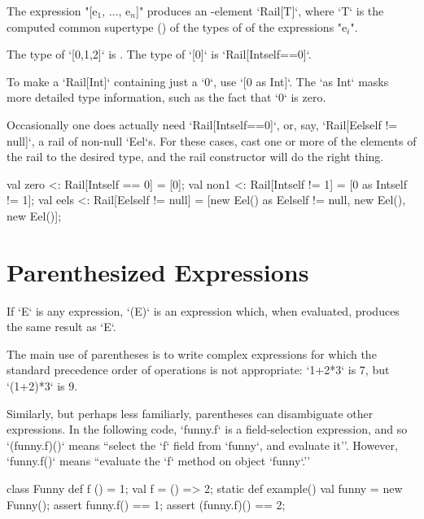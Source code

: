 The expression \xcdmath"[e$_1$, $\ldots$, e$_n$]" produces an -element
\xcd`Rail[T]`, where \xcd`T` is the computed common supertype ()
of the types of of the expressions  \xcdmath"e$_i$". 

\begin{ex}
The type of
\xcd`[0,1,2]` is .    
The type of 
\xcd`[0]` is  \xcd`Rail[Int{self==0}]`. 

To make a \xcd`Rail[Int]` containing just a \xcd`0`, use
\xcd`[0 as Int]`.  The \xcd`as Int` masks more detailed type information, such
as the fact that \xcd`0` is zero.

\end{ex}



\begin{ex}
Occasionally one does actually need \xcd`Rail[Int{self==0}]`, 
or, say, \xcd`Rail[Eel{self != null}]`, a rail of non-null \xcd`Eel`s.  
For these cases, cast one or more of the elements of the rail to 
the desired type, and the rail constructor will do the right thing.  
\begin{xten}
val zero <: Rail[Int{self == 0}]
          = [0];
val non1 <: Rail[Int{self != 1}]
          = [0 as Int{self != 1}];
val eels <: Rail[Eel{self != null}] 
          = [new Eel() as Eel{self != null}, 
             new Eel(), new Eel()];
\end{xten}
\end{ex}


\section{Parenthesized Expressions}

If \xcd`E` is any expression, \xcd`(E)` is an expression which, when
evaluated, produces the same result as \xcd`E`.   

\begin{ex}
The main use of parentheses is to write complex expressions for which the 
standard precedence order of operations is not appropriate: \xcd`1+2*3` is 7,
but \xcd`(1+2)*3` is 9.  

Similarly, but perhaps less familiarly, 
parentheses can disambiguate other expressions.  In the following code, 
\xcd`funny.f` is a field-selection expression, and so \xcd`(funny.f)()` means
``select the \xcd`f` field from \xcd`funny`, and evaluate it''.  However, 
\xcd`funny.f()` means ``evaluate the \xcd`f` method on object \xcd`funny`.''  
\begin{xten}
class Funny {
  def f () = 1;
  val f = () => 2;
  static def example() {
    val funny = new Funny();
    assert funny.f() == 1;
    assert (funny.f)() == 2;
  }
}
\end{xten}


\end{ex}

